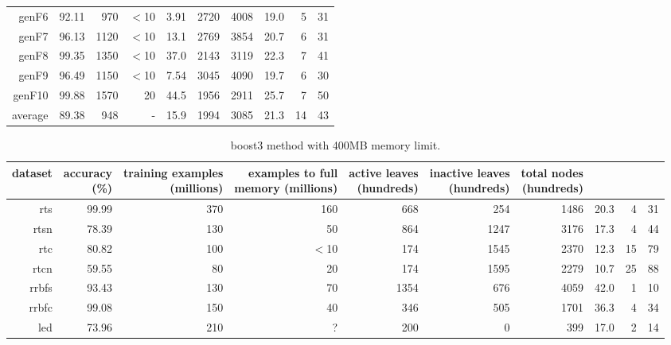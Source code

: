 \begin{table}
\begin{tabular}{|r|r|r|r|r|r|r|r|r|r|}
{\sc genF6} & 92.11 & 970 & $<$10 & 3.91 & 2720 & 4008 & 19.0 & 5 & 31 \\
{\sc genF7} & 96.13 & 1120 & $<$10 & 13.1 & 2769 & 3854 & 20.7 & 6 & 31 \\
{\sc genF8} & 99.35 & 1350 & $<$10 & 37.0 & 2143 & 3119 & 22.3 & 7 & 41 \\
{\sc genF9} & 96.49 & 1150 & $<$10 & 7.54 & 3045 & 4090 & 19.7 & 6 & 30 \\
{\sc genF10} & 99.88 & 1570 & 20 & 44.5 & 1956 & 2911 & 25.7 & 7 & 50 \\
\hline
average & 89.38 & 948 &  -  & 15.9 & 1994 & 3085 & 21.3 & 14 & 43 \\
\hline
\end{tabular}
\end{table}
\clearpage
\begin{table}
\caption{{\sc boost3} method with 400MB memory limit.}
\label{tab:boost3-400MB}
\centering
\begin{tabular}{|r|r|r|r|r|r|r|r|r|r|}
\hline
dataset	&
\rotatebox{90}{\parbox{9em}{accuracy\\(\%)}} &
\rotatebox{90}{\parbox{9em}{training examples\\(millions)}} &
\rotatebox{90}{\parbox{9em}{examples to full\\memory (millions)}} &
\rotatebox{90}{\parbox{9em}{active leaves\\(hundreds)}} &
\rotatebox{90}{\parbox{9em}{inactive leaves\\(hundreds)}} &
\rotatebox{90}{\parbox{9em}{total nodes\\(hundreds)}} &
\rotatebox{90}{\parbox{9em}{average tree depth}}	&
\rotatebox{90}{\parbox{9em}{training speed (\%)}} &
\rotatebox{90}{\parbox{9em}{prediction speed (\%)}} \\
\hline
{\sc rts} & 99.99 & 370 & 160 & 668 & 254 & 1486 & 20.3 & 4 & 31 \\
{\sc rtsn} & 78.39 & 130 & 50 & 864 & 1247 & 3176 & 17.3 & 4 & 44 \\
{\sc rtc} & 80.82 & 100 & $<$10 & 174 & 1545 & 2370 & 12.3 & 15 & 79 \\
{\sc rtcn} & 59.55 & 80 & 20 & 174 & 1595 & 2279 & 10.7 & 25 & 88 \\
{\sc rrbfs} & 93.43 & 130 & 70 & 1354 & 676 & 4059 & 42.0 & 1 & 10 \\
{\sc rrbfc} & 99.08 & 150 & 40 & 346 & 505 & 1701 & 36.3 & 4 & 34 \\
{\sc led} & 73.96 & 210 & ? & 200 & 0 & 399 & 17.0 & 2 & 14 \\

\end{tabular}
\end{table}
